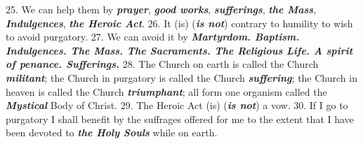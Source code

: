 \documentclass[a4paper,14pt]{memoir}
\newcommand\answer[1]{\textbf{\textit{#1}}}
\begin{document}
25. We can help them by \answer{prayer}, \answer{good works}, \answer{sufferings}, \answer{the Mass}, \answer{Indulgences}, \answer{the Heroic Act}. 
26. 
It (is) (\answer{is not}) contrary to humility to wish to  avoid  purgatory. 
27.   We
can avoid it by \answer{Martyrdom. Baptism. Indulgences. The Mass. The Sacraments. The Religious Life. A spirit of penance. Sufferings.}
28. 
The Church on earth is called the Church \answer{militant}; the Church in purgatory  is
called the Church \answer{suffering}; the Church in heaven is called the Church  \answer{triumphant};
 all form one organism called the \answer{Mystical} Body of Christ.
29.  The Heroic  Act
(is) (\answer{is not}) a vow.
30.  If I  go  to  purgatory  I  shall  benefit  by  the
suffrages offered for me to the extent that I have been  devoted  to  \answer{the Holy Souls}
while on earth.
\end{document}
